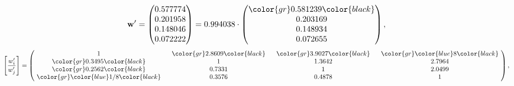 \begin{example}
\begin{equation*}
\mathbf{w}^{\prime} =
\begin{pmatrix}
0.577774\\
0.201958\\
0.148046\\
0.072222
\end{pmatrix} =
0.994038\cdot
\begin{pmatrix}
\color{gr} 0.581239\color{black} \\
0.203169\\
0.148934\\
0.072655
\end{pmatrix},
\end{equation*}
\begin{equation*}
\left[ \frac{{w}^{\prime}_i}{{w}^{\prime}_j} \right] =
\begin{pmatrix}
$\,\,$ 1 $\,\,$ & $\,\,$\color{gr} 2.8609\color{black} $\,\,$ & $\,\,$\color{gr} 3.9027\color{black} $\,\,$ & $\,\,$\color{gr} \color{blue} 8\color{black} $\,\,$ \\
$\,\,$\color{gr} 0.3495\color{black} $\,\,$ & $\,\,$ 1 $\,\,$ & $\,\,$1.3642$\,\,$ & $\,\,$2.7964  $\,\,$ \\
$\,\,$\color{gr} 0.2562\color{black} $\,\,$ & $\,\,$0.7331$\,\,$ & $\,\,$ 1 $\,\,$ & $\,\,$2.0499 $\,\,$ \\
$\,\,$\color{gr} \color{blue}  1/8\color{black} $\,\,$ & $\,\,$0.3576$\,\,$ & $\,\,$0.4878$\,\,$ & $\,\,$ 1  $\,\,$ \\
\end{pmatrix},
\end{equation*}
\end{example}
\newpage
